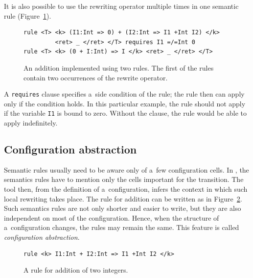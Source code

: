 \documentclass[nolot,nolof,nocover,printed]{fithesis3}
\begin{document}
It is also possible to use the rewriting operator multiple times in one semantic rule (Figure~\ref{fig:twoRewrites}).

\begin{figure}[ht]
\begin{lstlisting}
rule <T> <k> (I1:Int => 0) + (I2:Int => I1 +Int I2) </k>
         <ret> _ </ret> </T> requires I1 =/=Int 0
rule <T> <k> (0 + I:Int) => I </k> <ret> _ </ret> </T>
\end{lstlisting}
\caption{An addition implemented using two rules. The first of the rules contain two occurrences of the rewrite operator.}
\label{fig:twoRewrites}
\end{figure}
A \lstinline|requires| clause specifies a~side condition of the rule; the rule then can apply only if the condition holds. In this particular example, the rule should not apply if the variable \lstinline|I1| is bound to zero. Without the clause, the rule would be able to apply indefinitely.

 
\subsection{Configuration abstraction}

Semantic rules usually need to be aware only of a~few configuration cells. In \K, the semantics rules have to mention only the cells important for the transition. The \K tool then, from the definition of a~configuration, infers the context in which such local rewriting takes place. The rule for addition can be written as in Figure~\ref{ruleAddInKCell}. Such semantics rules are not only shorter and easier to write, but they are also independent on most of the configuration. Hence, when the structure of a~configuration changes, the rules may remain the same. This feature is called \textit{configuration abstraction}.


\begin{figure}[ht]
\begin{lstlisting}
rule <k> I1:Int + I2:Int => I1 +Int I2 </k>
\end{lstlisting}
\caption{A rule for addition of two integers.}
\label{ruleAddInKCell}
\end{figure}
\end{document}
